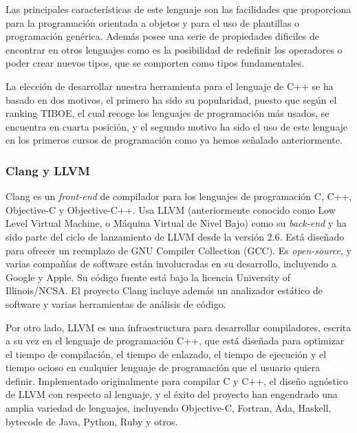 Las principales caracter\'isticas de este lenguaje son las facilidades que proporciona para la programaci\'on orientada a objetos y para el uso de plantillas o programaci\'on gen\'erica. Adem\'as posee una serie de propiedades dificiles de encontrar en otros lenguajes como es la posibilidad de redefinir los operadores o poder crear nuevos tipos, que se comporten como tipos fundamentales.

La elecci\'on de desarrollar nuestra herramienta para el lenguaje de C++ se ha basado en dos motivos, el primero ha sido su popularidad, puesto que seg\'un el ranking TIBOE, el cual recoge los lenguajes de programaci\'on m\'as usados, se encuentra en cuarta posici\'on, y el segundo motivo ha sido el uso de este lenguaje en los primeros cursos de programaci\'on como ya hemos se\~nalado anteriormente.

\subsubsection*{Clang y LLVM}

Clang es un {\it front-end} de compilador para los lenguajes de programaci\'on C, C++, Objective-C y Objective-C++. Usa LLVM (anteriormente conocido como Low Level Virtual Machine, o M\'aquina Virtual de Nivel Bajo) como su {\it back-end} y ha sido parte del ciclo de lanzamiento de LLVM desde la versi\'on 2.6. Est\'a dise\~nado para ofrecer un reemplazo de GNU Compiler Collection (GCC). Es {\it open-source}, y varias compa\~n\'ias de software est\'an involucradas en su desarrollo, incluyendo a Google y Apple. Su c\'odigo fuente est\'a bajo la licencia University of Illinois/NCSA. El proyecto Clang incluye adem\'as un analizador est\'atico de software y varias herramientas de an\'alisis de c\'odigo.

Por otro lado, LLVM es una infraestructura para desarrollar compiladores, escrita a su vez en el lenguaje de programaci\'on C++, que est\'a dise\~nada para optimizar el tiempo de compilaci\'on, el tiempo de enlazado, el tiempo de ejecuci\'on y el tiempo ocioso en cualquier lenguaje de programaci\'on que el usuario quiera definir. Implementado originalmente para compilar C y C++, el dise\~no agn\'ostico de LLVM con respecto al lenguaje, y el \'exito del proyecto han engendrado una amplia variedad de lenguajes, incluyendo Objective-C, Fortran, Ada, Haskell, bytecode de Java, Python, Ruby y otros.

